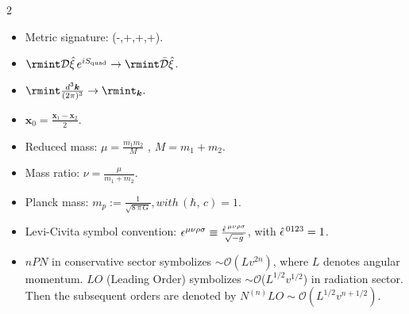 \begin{multicols}{2}
\begin{itemize}
    \item Metric signature: (-,+,+,+).
    \item $\rmint \mathcal{D}\hat\xi \,e^{iS_{\text{quad}}}\rightarrow \rmint \Bar{\mathcal{D}}\hat\xi$.
    \item $\rmint \frac{d^3\boldsymbol{k}}{(2\pi)^3}\rightarrow \rmint_{\boldsymbol{k}}.$
    \item ${\boldsymbol{x}}_0=\frac{\boldsymbol{x}_1-\boldsymbol{x}_2}{2}.$
    \item Reduced mass: $\mu=\frac{m_1m_2}{M}$\,\,,\,\,$M=m_1+m_2$.
    \item Mass ratio: $\nu=\frac{\mu}{m_1+m_2}$.
    \item Planck mass: $m_p:=\frac{1}{\sqrt{8\,\pi\, G}},\textstyle{with\, (\hbar,\,c)=1.}$
\end{itemize}
\end{multicols}
\begin{itemize}
\item Levi-Civita symbol convention: $\epsilon^{\mu\nu\rho\sigma}\equiv\frac{\Hat{\epsilon}^{\,\mu\nu\rho\sigma}}{\sqrt{-g}}$, with $\Hat{\epsilon}^{\,0123}=1$.
\item $nPN$ in conservative sector symbolizes $\sim \mathcal{O}(Lv^{2n})$, where $L$ denotes angular momentum.
 $LO$ (Leading Order) symbolizes $\sim\mathcal{O}$($L^{1/2}v^{1/2}$) in radiation sector. Then the subsequent orders are denoted by $N^{(n)}LO\sim \mathcal{O}(L^{1/2}v^{n+1/2}).$

\end{itemize}

